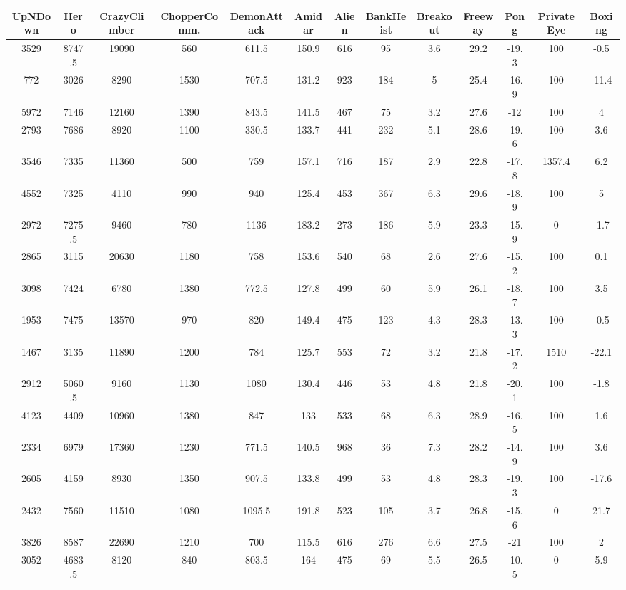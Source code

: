 \begin{table}[!ht]
\centering
\small
\setlength\tabcolsep{2.5pt}
\begin{tabular}{c|c|c|c|c|c|c|c|c|c|c|c|c}
\hline
UpNDown &	Hero &	CrazyClimber &	ChopperComm. &	DemonAttack &	Amidar &	Alien &	BankHeist &	Breakout &	Freeway &	Pong &	PrivateEye &	Boxing \\
\hline
3529 & 8747.5 &	19090 &	560 &	611.5 &	150.9 &	616 &	95 &	3.6 &	29.2 &	-19.3 &	100 &	-0.5 \\
772 & 3026 &	8290 &	1530 &	707.5 &	131.2 &	923 &	184	& 5 &	25.4 &	-16.9 &	100 &	-11.4 \\
5972 & 7146 &	12160 &	1390 &	843.5 &	141.5 &	467 &	75 &	3.2 &	27.6 &	-12 &	100 &	4 \\
2793 &	7686 &	8920 &	1100 &	330.5 &	133.7 &	441 &	232 &	5.1 &	28.6 &	-19.6 &	100 &	3.6 \\
3546 &	7335 &	11360 &	500 &	759 &	157.1 &	716 &	187 &	2.9 &	22.8 &	-17.8 &	1357.4 &	6.2 \\
4552 &	7325 &	4110 &	990 &	940 &	125.4 &	453 &	367 &	6.3 &	29.6 &	-18.9 &	100 &	5 \\
2972 &	7275.5 &	9460 &	780 &	1136 &	183.2 &	273 &	186 &	5.9 &	23.3 &	-15.9 &	0 &	-1.7 \\
2865 &	3115 &	20630 &	1180 &	758 &	153.6 &	540 &	68 &	2.6 &	27.6 &	-15.2 &	100 &	0.1 \\
3098 &	7424 &	6780 &	1380 &	772.5 &	127.8 &	499 &	60 &	5.9 &	26.1 &	-18.7 &	100 &	3.5 \\
1953 &	7475 &	13570 &	970 &	820 &	149.4 &	475 &	123 &	4.3 &	28.3 &	-13.3 &	100 &	-0.5 \\
1467 &	3135 &	11890 &	1200 &	784 &	125.7 &	553 &	72 &	3.2 &	21.8 &	-17.2 &	1510 &	-22.1 \\
2912 &	5060.5 &	9160 &	1130 &	1080 &	130.4 &	446 &	53 &	4.8 &	21.8 &	-20.1 &	100 &	-1.8 \\
4123 &	4409 &	10960 &	1380 &	847 &	133 &	533 &	68 &	6.3 &	28.9 &	-16.5 &	100 &	1.6 \\
2334 &	6979 &	17360 &	1230 &	771.5 &	140.5 &	968 &	36 &	7.3 &	28.2 &	-14.9 &	100 &	3.6 \\
2605 &	4159 &	8930 &	1350 &	907.5 &	133.8 &	499 &	53 &	4.8 &	28.3 &	-19.3 &	100 &	-17.6 \\
2432 &	7560 &	11510 &	1080 &	1095.5 &	191.8 &	523 &	105 &	3.7 &	26.8 &	-15.6 &	0	 & 21.7 \\
3826 &	8587 &	22690 &	1210 &	700 &	115.5 &	616	 &276	 &6.6 &	27.5	 &-21	 &100	 &2 \\
3052 &	4683.5 &	8120 &	840 &	803.5 &	164 &	475 &	69	 &5.5 &	26.5 &	-10.5 &	0	 &5.9 \\

\end{tabular}
\end{table}

